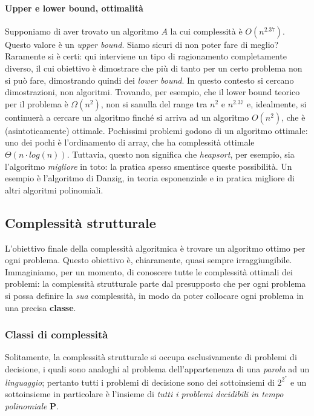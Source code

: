 \paragraph{Upper e lower bound, ottimalità}
Supponiamo di aver trovato un algoritmo $A$ la cui complessità è $O(n^{2.37})$.
Questo valore è un \textit{upper bound}. Siamo sicuri di non poter fare di meglio?
Raramente si è certi: qui interviene un tipo di ragionamento completamente
diverso, il cui obiettivo è dimostrare che più di tanto per un certo problema
non si può fare, dimostrando quindi dei \textit{lower bound}. In questo contesto
si cercano dimostrazioni, non algoritmi. Trovando, per esempio, che il lower
bound teorico per il problema è $\Omega(n^2)$, non si sanulla del range tra
$n^2$ e $n^{2.37}$ e, idealmente, si continuerà a cercare un algoritmo finché si arriva ad un
algoritmo $O(n^2)$, che è (asintoticamente) ottimale. Pochissimi problemi
godono di un algoritmo ottimale: uno dei pochi è l'ordinamento di array, che ha
complessità ottimale $\Theta(n\cdot log(n))$. Tuttavia, questo non significa
che \textit{heapsort}, per esempio, sia l'algoritmo \textit{migliore} in toto:
la pratica spesso smentisce queste possibilità. Un esempio è l'algoritmo
di Danzig, in teoria esponenziale e in pratica migliore di altri algoritmi
polinomiali.

\subsection{Complessità strutturale}
L'obiettivo finale della complessità algoritmica è trovare un algoritmo
ottimo per ogni problema. Questo obiettivo è, chiaramente, quasi sempre
irraggiungibile. Immaginiamo, per un momento, di conoscere tutte le complessità
ottimali dei problemi: la complessità strutturale parte dal presupposto che
per ogni problema si possa definire la \textit{sua} complessità, in modo da
poter collocare ogni problema in una precisa \textbf{classe}.

\subsubsection{Classi di complessità}
Solitamente, la complessità strutturale si occupa esclusivamente di problemi 
di decisione, i quali sono analoghi al problema dell'appartenenza di una 
\textit{parola} ad un \textit{linguaggio}; pertanto tutti i problemi di decisione 
sono dei sottoinsiemi di $2^{2^*}$ e un sottoinsieme in particolare è 
l'insieme di \textit{tutti i problemi decidibili in tempo polinomiale} $\mathbf{P}$. 

